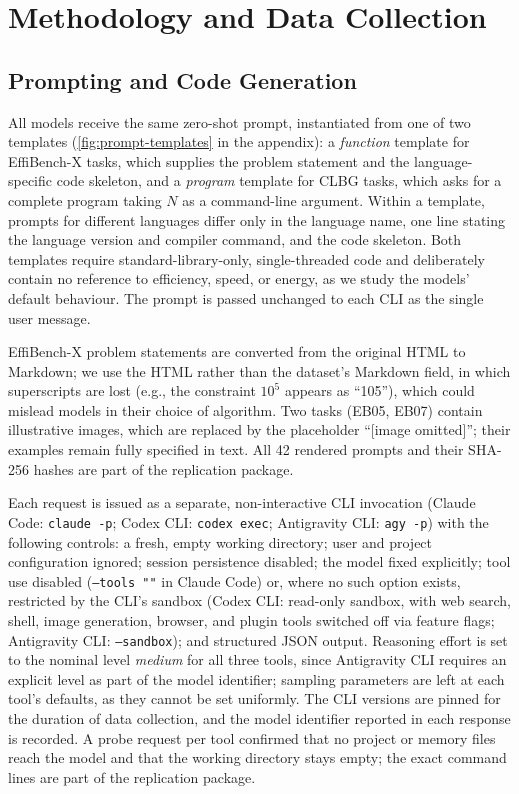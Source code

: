 \section{Methodology and Data Collection}
\label{sec:methodology}

\subsection{Prompting and Code Generation}
\label{sec:generation}
All models receive the same zero-shot prompt, instantiated from one of two templates
(\cref{fig:prompt-templates} in the appendix): a \emph{function} template for EffiBench-X
tasks, which supplies the problem statement and the language-specific code skeleton, and a
\emph{program} template for CLBG tasks, which asks for a complete program taking $N$ as a
command-line argument. Within a template, prompts for different languages differ only in
the language name, one line stating the language version and compiler command, and the
code skeleton. Both templates require standard-library-only, single-threaded code and
deliberately contain no reference to efficiency, speed, or energy, as we study the models'
default behaviour. The prompt is passed unchanged to each CLI as the single user message.

EffiBench-X problem statements are converted from the original HTML to Markdown; we use
the HTML rather than the dataset's Markdown field, in which superscripts are lost (e.g.,
the constraint $10^5$ appears as ``105''), which could mislead models in their choice of
algorithm. Two tasks (EB05, EB07) contain illustrative images, which are replaced by the
placeholder ``[image omitted]''; their examples remain fully specified in text. All 42
rendered prompts and their SHA-256 hashes are part of the replication package.

Each request is issued as a separate, non-interactive CLI invocation (Claude Code:
\texttt{claude -p}; Codex CLI: \texttt{codex exec}; Antigravity CLI: \texttt{agy -p}) with the
following controls: a fresh, empty working directory; user and project configuration
ignored; session persistence disabled; the model fixed explicitly; tool use disabled
(\texttt{--tools ""} in Claude Code) or, where no such option exists, restricted by the
CLI's sandbox (Codex CLI: read-only sandbox, with web search, shell, image generation,
browser, and plugin tools switched off via feature flags; Antigravity CLI: \texttt{--sandbox}); and structured JSON output. Reasoning effort is set to the nominal level
\emph{medium} for all three tools, since Antigravity CLI requires an explicit level as part
of the model identifier; sampling parameters are left at each tool's defaults, as they
cannot be set uniformly. The CLI versions are pinned for the duration of data collection, and
the model identifier reported in each response is recorded.
A probe request per tool confirmed that no project or memory files reach the model and that
the working directory stays empty; the exact command lines are part of the replication
package.

